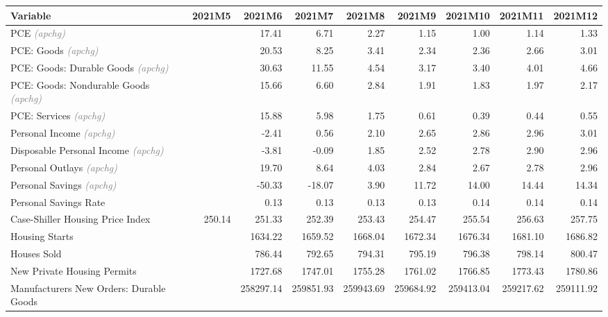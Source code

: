 \documentclass[11pt, letterpaper]{article}\usepackage[]{graphicx}\usepackage[]{color}
\begin{document}
\begin{table}[H]
\centering
\begingroup\fontsize{10pt}{12pt}\selectfont
\begin{tabular}{lrrrrrrrr}
  \hline
Variable & 2021M5 & 2021M6 & 2021M7 & 2021M8 & 2021M9 & 2021M10 & 2021M11 & 2021M12 \\ 
  \hline
PCE \textit{\footnotesize\textcolor{gray}{(apchg)}} &  & 17.41 & 6.71 & 2.27 & 1.15 & 1.00 & 1.14 & 1.33 \\ 
  PCE: Goods \textit{\footnotesize\textcolor{gray}{(apchg)}} &  & 20.53 & 8.25 & 3.41 & 2.34 & 2.36 & 2.66 & 3.01 \\ 
  PCE: Goods: Durable Goods \textit{\footnotesize\textcolor{gray}{(apchg)}} &  & 30.63 & 11.55 & 4.54 & 3.17 & 3.40 & 4.01 & 4.66 \\ 
  PCE: Goods: Nondurable Goods \textit{\footnotesize\textcolor{gray}{(apchg)}} &  & 15.66 & 6.60 & 2.84 & 1.91 & 1.83 & 1.97 & 2.17 \\ 
  PCE: Services \textit{\footnotesize\textcolor{gray}{(apchg)}} &  & 15.88 & 5.98 & 1.75 & 0.61 & 0.39 & 0.44 & 0.55 \\ 
  Personal Income \textit{\footnotesize\textcolor{gray}{(apchg)}} &  & -2.41 & 0.56 & 2.10 & 2.65 & 2.86 & 2.96 & 3.01 \\ 
  Disposable Personal Income \textit{\footnotesize\textcolor{gray}{(apchg)}} &  & -3.81 & -0.09 & 1.85 & 2.52 & 2.78 & 2.90 & 2.96 \\ 
  Personal Outlays \textit{\footnotesize\textcolor{gray}{(apchg)}} &  & 19.70 & 8.64 & 4.03 & 2.84 & 2.67 & 2.78 & 2.96 \\ 
  Personal Savings \textit{\footnotesize\textcolor{gray}{(apchg)}} &  & -50.33 & -18.07 & 3.90 & 11.72 & 14.00 & 14.44 & 14.34 \\ 
  Personal Savings Rate &  & 0.13 & 0.13 & 0.13 & 0.13 & 0.14 & 0.14 & 0.14 \\ 
  Case-Shiller Housing Price Index & 250.14 & 251.33 & 252.39 & 253.43 & 254.47 & 255.54 & 256.63 & 257.75 \\ 
  Housing Starts &  & 1634.22 & 1659.52 & 1668.04 & 1672.34 & 1676.34 & 1681.10 & 1686.82 \\ 
  Houses Sold &  & 786.44 & 792.65 & 794.31 & 795.19 & 796.38 & 798.14 & 800.47 \\ 
  New Private Housing Permits &  & 1727.68 & 1747.01 & 1755.28 & 1761.02 & 1766.85 & 1773.43 & 1780.86 \\ 
  Manufacturers New Orders: Durable Goods &  & 258297.14 & 259851.93 & 259943.69 & 259684.92 & 259413.04 & 259217.62 & 259111.92 \\ 

\end{tabular}
\end{table}
\end{document}
